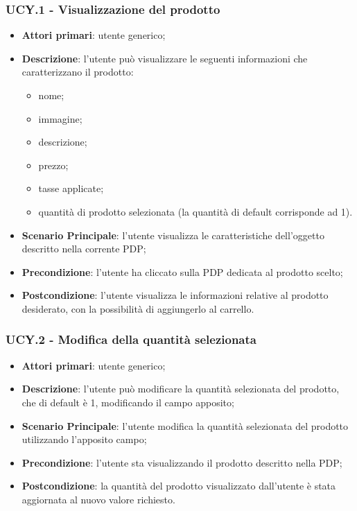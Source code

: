 \subsubsection{UCY.1 - Visualizzazione del prodotto}
\begin{itemize}
\item \textbf{Attori primari}: utente generico;
\item \textbf{Descrizione}: l'utente può visualizzare le seguenti informazioni che caratterizzano il prodotto:
\begin{itemize}
\item nome;
\item immagine;
\item descrizione;
\item prezzo;
\item tasse applicate;
\item quantità di prodotto selezionata (la quantità di default corrisponde ad 1).
\end{itemize}
\item \textbf{Scenario Principale}: l'utente visualizza le caratteristiche dell'oggetto descritto nella corrente PDP;
\item \textbf{Precondizione}: l'utente ha cliccato sulla PDP dedicata al prodotto scelto;
\item \textbf{Postcondizione}: l'utente visualizza le informazioni relative al prodotto desiderato, con la possibilità di aggiungerlo al carrello.
\end{itemize}
\subsubsection{UCY.2 - Modifica della quantità selezionata}
\begin{itemize}
\item \textbf{Attori primari}: utente generico;
\item \textbf{Descrizione}: l'utente può modificare la quantità selezionata del prodotto, che di default è 1, modificando il campo apposito;
\item \textbf{Scenario Principale}: l'utente modifica la quantità selezionata del prodotto utilizzando l'apposito campo;
\item \textbf{Precondizione}: l'utente sta visualizzando il prodotto descritto nella PDP;
\item \textbf{Postcondizione}: la quantità del prodotto visualizzato dall'utente è stata aggiornata al nuovo valore richiesto.
\end{itemize}
